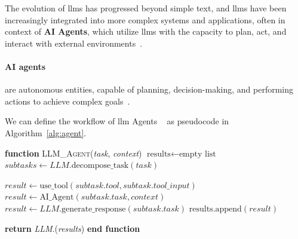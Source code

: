 The evolution of \glspl{llm} has progressed beyond simple text, and
\glspl{llm} have been increasingly integrated into more complex systems and
applications, often in context of \textbf{AI Agents}, which utilize \glspl{llm}
with the capacity to plan, act, and interact with external
environments~\cite{naveed2023,zhao2023}.

\paragraph{AI agents} are autonomous entities, capable of planning,
decision-making, and performing actions to achieve complex
goals~\cite{naveed2023,zhao2023}.

We can define the workflow of \gls{llm} Agents ~\cite{nvidia-llm-agent} as
pseudocode in Algorithm~\ref{alg:agent}.

\begin{algorithm}[t]
\caption{Pseudocode for \gls{llm} Agent workflow}
\label{alg:agent}
\begin{algorithmic}[1]
\STATE \textbf{function} \textsc{LLM\_Agent}(\textit{task}, \textit{context})
    \STATE \quad $\text{results} \gets \text{empty list}$ 
    \STATE \quad $\textit{subtasks} \gets \textit{LLM}.\text{decompose\_task}(\textit{task})$ 

            \STATE $\textit{result} \gets \text{use\_tool}(\textit{subtask}.\textit{tool}, \textit{subtask}.\textit{tool\_input})$
            \STATE {}
            \STATE $\textit{result} \gets \text{AI\_Agent}(\textit{subtask}.\textit{task}, \textit{context})$
            \STATE $\textit{result} \gets \textit{LLM}.\text{generate\_response}(\textit{subtask}.\textit{task})$
        \ENDIF
        \STATE $\text{results}.\text{append}(\textit{result})$
    \ENDFOR

    \STATE \quad \textbf{return} \textit{LLM}.(\textit{results})
\STATE \textbf{end function}
\end{algorithmic}
\end{algorithm}

